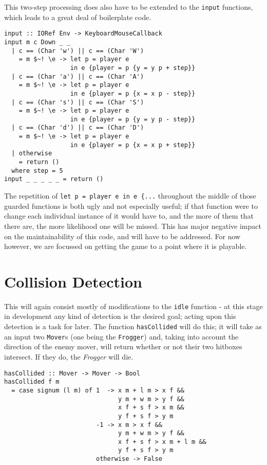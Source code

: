 \documentclass[12pt, a4paper]{report}
\begin{document}
This two-step processing does also have to be extended to the \verb|input| functions, which leads to a great deal of boilerplate code.

\begin{lstlisting}
input :: IORef Env -> KeyboardMouseCallback
input m c Down _ _
  | c == (Char 'w') || c == (Char 'W')
    = m $~! \e -> let p = player e
                  in e {player = p {y = y p + step}}
  | c == (Char 'a') || c == (Char 'A')
    = m $~! \e -> let p = player e
                  in e {player = p {x = x p - step}}
  | c == (Char 's') || c == (Char 'S')
    = m $~! \e -> let p = player e
                  in e {player = p {y = y p - step}}
  | c == (Char 'd') || c == (Char 'D')
    = m $~! \e -> let p = player e
                  in e {player = p {x = x p + step}}
  | otherwise
    = return ()
  where step = 5
input _ _ _ _ _ = return ()
\end{lstlisting}

The repetition of \verb|let p = player e in e {...| throughout the middle of those guarded functions is both ugly and not especially useful; if that function were to change each individual instance of it would have to, and the more of them that there are, the more likelihood one will be missed.
This has major negative impact on the maintainability of this code, and will have to be addressed.
For now however, we are focussed on getting the game to a point where it is playable.

\section{Collision Detection}

This will again consist mostly of modifications to the \verb|idle| function - at this stage in development any kind of detection is the desired goal; acting upon this detection is a task for later.
The function \verb|hasCollided| will do this; it will take as an input two \verb|Mover|s (one being the \verb|Frogger|) and, taking into account the direction of the enemy mover, will return whether or not their two hitboxes intersect.
If they do, the \textit{Frogger} will die.

\begin{lstlisting}
hasCollided :: Mover -> Mover -> Bool
hasCollided f m
  = case signum (l m) of 1  -> x m + l m > x f &&
                               y m + w m > y f &&
                               x f + s f > x m &&
                               y f + s f > y m
                         -1 -> x m > x f &&
                               y m + w m > y f &&
                               x f + s f > x m + l m &&
                               y f + s f > y m
                         otherwise -> False
\end{lstlisting}
\end{document}

